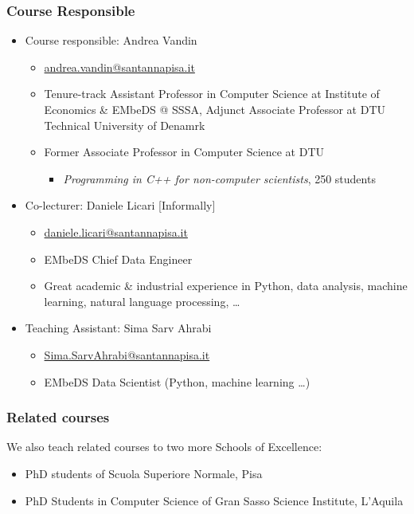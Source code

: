 \documentclass{beamer}%
\begin{document}
\begin{frame}
\frametitle{Course Responsible}
 \begin{itemize}
   \item Course responsible: Andrea Vandin
	\begin{itemize}
      \item\href{mailto:andrea.vandin@santannapisa.it}{\color{blue}andrea.vandin@santannapisa.it}
	  \item Tenure-track Assistant Professor in Computer Science at Institute of Economics \& EMbeDS @ SSSA, Adjunct Associate Professor at DTU Technical University of Denamrk
	  \item Former Associate Professor in Computer Science at DTU
	  \begin{itemize}
      \item 
	   {\scriptsize \emph{Programming in C++ for non-computer scientists}, 250 students}
	  \end{itemize}
    \end{itemize}
      \item Co-lecturer: Daniele Licari [Informally]
	\begin{itemize}
	\item \href{mailto:daniele.licari@santannapisa.it}{\color{blue}daniele.licari@santannapisa.it}
	\item EMbeDS Chief Data Engineer
	\item Great academic \& industrial experience in Python, data analysis, machine learning, natural language processing, \ldots
	\end{itemize}
      \item Teaching Assistant: Sima Sarv Ahrabi
\begin{itemize}
	\item \href{mailto:Sima.SarvAhrabi@santannapisa.it}{\color{blue}Sima.SarvAhrabi@santannapisa.it}
	\item EMbeDS Data Scientist (Python,  machine learning \ldots)
\end{itemize}

	\end{itemize}
\end{frame}

\begin{frame}
	\frametitle{Related courses}
	We also teach related courses to two more Schools of Excellence:
		\begin{itemize}
			\item PhD students of Scuola Superiore Normale, Pisa
			\item PhD Students in Computer Science of Gran Sasso Science Institute, L'Aquila
		\end{itemize}
\end{frame}
\end{document}
